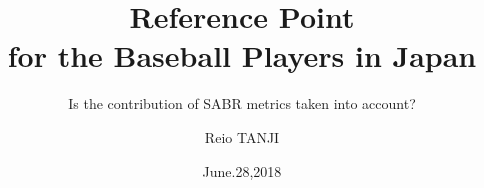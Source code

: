 \documentclass[dvipdfmx,12pt]{beamer}
\title{Reference Point \\ for the Baseball Players in Japan}
\subtitle{Is the contribution of SABR metrics taken into account?}
\author{Reio TANJI}
\date{June.28,2018}
\institute{Osaka University}
\begin{document}
\begin{frame}\frametitle{}
\titlepage
\end{frame}
\end{document}
